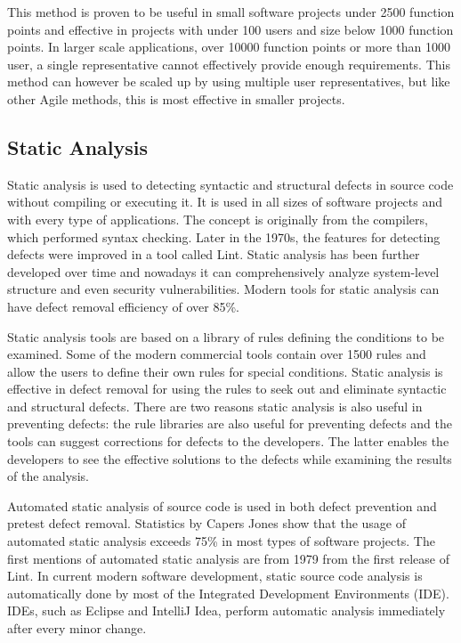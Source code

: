 This method is proven to be useful in small software projects under 2500 function points and effective in projects with under 100 users and size below 1000 function points. In larger scale applications, over 10000 function points or more than 1000 user, a single representative cannot effectively provide enough requirements. This method can however be scaled up by using multiple user representatives, but like other Agile methods, this is most effective in smaller projects.



\subsection{Static Analysis} 
Static analysis is used to detecting syntactic and structural defects in source code without compiling or executing it. It is used in all sizes of software projects and with every type of applications. The concept is originally from the compilers, which performed syntax checking. Later in the 1970s, the features for detecting defects were improved in a tool called Lint. Static analysis has been further developed over time and nowadays it can comprehensively analyze system-level structure and even security vulnerabilities. Modern tools for static analysis can have defect removal efficiency of over 85\%.

Static analysis tools are based on a library of rules defining the conditions to be examined. Some of the modern commercial tools contain over 1500 rules and allow the users to define their own rules for special conditions. Static analysis is effective in defect removal for using the rules to seek out and eliminate syntactic and structural defects. There are two reasons static analysis is also useful in preventing defects: the rule libraries are also useful for preventing defects and the tools can suggest corrections for defects to the developers. The latter enables the developers to see the effective solutions to the defects while examining the results of the analysis.

Automated static analysis of source code is used in both defect prevention and pretest defect removal. Statistics by Capers Jones show that the usage of automated static analysis exceeds 75\% in most types of software projects. The first mentions of automated static analysis are from 1979 from the first release of Lint. In current modern software development, static source code analysis is automatically done by most of the Integrated Development Environments (IDE). IDEs, such as Eclipse and IntelliJ Idea, perform automatic analysis immediately after every minor change.

